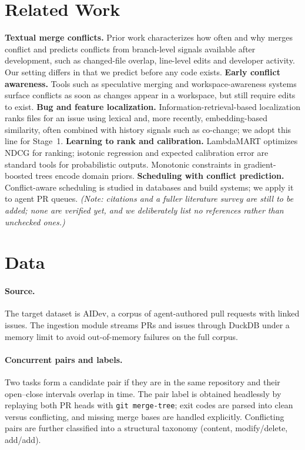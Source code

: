 \documentclass[sigconf, authorversion, nonacm]{acmart}
\begin{document}
\section{Related Work}
\textbf{Textual merge conflicts.} Prior work characterizes how often and why merges conflict and predicts conflicts from branch-level signals available after development, such as changed-file overlap, line-level edits and developer activity. Our setting differs in that we predict before any code exists. \textbf{Early conflict awareness.} Tools such as speculative merging and workspace-awareness systems surface conflicts as soon as changes appear in a workspace, but still require edits to exist. \textbf{Bug and feature localization.} Information-retrieval-based localization ranks files for an issue using lexical and, more recently, embedding-based similarity, often combined with history signals such as co-change; we adopt this line for Stage~1. \textbf{Learning to rank and calibration.} LambdaMART optimizes NDCG for ranking; isotonic regression and expected calibration error are standard tools for probabilistic outputs. Monotonic constraints in gradient-boosted trees encode domain priors. \textbf{Scheduling with conflict prediction.} Conflict-aware scheduling is studied in databases and build systems; we apply it to agent PR queues. \emph{(Note: citations and a fuller literature survey are still to be added; none are verified yet, and we deliberately list no references rather than unchecked ones.)}

\section{Data}
\label{sec:data}
\paragraph{Source.} The target dataset is AIDev, a corpus of agent-authored pull requests with linked issues. The ingestion module streams PRs and issues through DuckDB under a memory limit to avoid out-of-memory failures on the full corpus.

\paragraph{Concurrent pairs and labels.} Two tasks form a candidate pair if they are in the same repository and their open--close intervals overlap in time. The pair label is obtained headlessly by replaying both PR heads with \texttt{git merge-tree}; exit codes are parsed into clean versus conflicting, and missing merge bases are handled explicitly. Conflicting pairs are further classified into a structural taxonomy (content, modify/delete, add/add).
\end{document}
